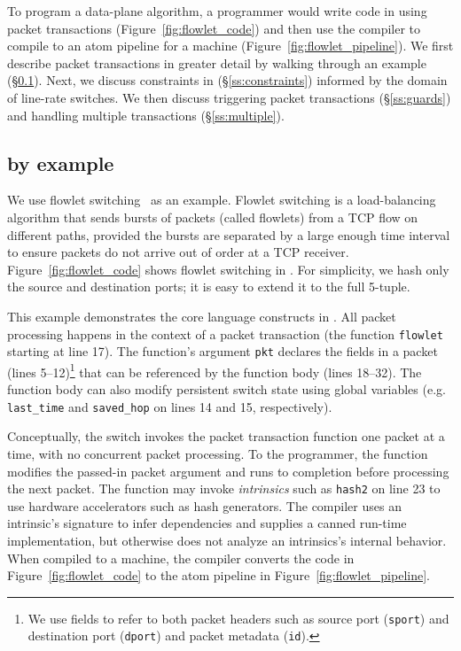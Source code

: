 To program a data-plane algorithm, a programmer would write code in
\pktlanguage using packet transactions (Figure~\ref{fig:flowlet_code})
and then use the \pktlanguage compiler to compile to an atom pipeline
for a \absmachine machine (Figure~\ref{fig:flowlet_pipeline}). We
first describe packet transactions in greater detail by walking
through an example (\S\ref{ss:flowlet}). Next, we discuss constraints
in \pktlanguage (\S\ref{ss:constraints}) informed by the domain of
line-rate switches. We then discuss triggering packet transactions
(\S\ref{ss:guards}) and handling multiple transactions
(\S\ref{ss:multiple}).

\subsection{\pktlanguage by example}
\label{ss:flowlet}


We use flowlet switching~\cite{flowlets} as an example. Flowlet
switching is a load-balancing algorithm that sends bursts of packets
(called flowlets) from a TCP flow on different paths, provided the
bursts are separated by a large enough time interval to ensure packets
do not arrive out of order at a TCP
receiver. Figure~\ref{fig:flowlet_code} shows flowlet switching in
\pktlanguage. For simplicity, we hash only the source and destination
ports; it is easy to extend it to the full 5-tuple.

This example demonstrates the core language constructs in
\pktlanguage. All packet processing happens in the context of a packet
transaction (the function \texttt{flowlet} starting at line 17). The
function's argument {\tt pkt} declares the fields in a packet (lines
5--12)\footnote{We use fields to refer to both packet headers such as
  source port ({\tt sport}) and destination port ({\tt dport}) and
  packet metadata ({\tt id}).} that can be referenced by the function
body (lines 18--32).  The function body can also modify persistent
switch state using global variables (e.g.  \texttt{last\_time} and
\texttt{saved\_hop} on lines 14 and 15, respectively).

Conceptually, the switch invokes the packet transaction function one
packet at a time, with no concurrent packet processing. To the
programmer, the function modifies the passed-in packet argument and
runs to completion before processing the next packet.  The function
may invoke \textit{intrinsics} such as \texttt{hash2} on line 23 to
use hardware accelerators such as hash generators.  The \pktlanguage
compiler uses an intrinsic's signature to infer dependencies and
supplies a canned run-time implementation, but otherwise does not
analyze an intrinsics's internal behavior. When compiled to a
\absmachine machine, the compiler converts the code in
Figure~\ref{fig:flowlet_code} to the atom pipeline in
Figure~\ref{fig:flowlet_pipeline}.

